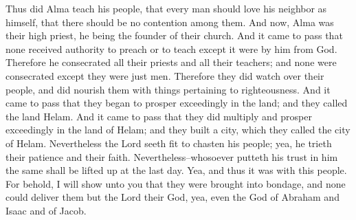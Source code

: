 Thus did Alma teach his people, that every man should love his neighbor as himself, that there should be no contention among them.
\bverse \iffalse And now, Alma was their high priest, he being the founder of their church. \fi
And now, Alma was their high priest, he being the founder of their church.
\bverse \iffalse And it came to pass that none received authority to preach or to teach except it were by him from God. Therefore he consecrated all their priests and all their teachers; and none were consecrated except they were just men. \fi
And it came to pass that none received authority to preach or to teach except it were by him from God. Therefore he consecrated all their priests and all their teachers; and none were consecrated except they were just men.
\bverse \iffalse Therefore they did watch over their people, and did nourish them with things pertaining to righteousness. \fi
Therefore they did watch over their people, and did nourish them with things pertaining to righteousness.
\bverse \iffalse And it came to pass that they began to prosper exceedingly in the land; and they called the land Helam. \fi
And it came to pass that they began to prosper exceedingly in the land; and they called the land Helam.
\bverse \iffalse And it came to pass that they did multiply and prosper exceedingly in the land of Helam; and they built a city, which they called the city of Helam. \fi
And it came to pass that they did multiply and prosper exceedingly in the land of Helam; and they built a city, which they called the city of Helam.
\bverse \iffalse Nevertheless the Lord seeth fit to chasten his people; yea, he trieth their patience and their faith. \fi
Nevertheless the Lord seeth fit to chasten his people; yea, he trieth their patience and their faith.
\bverse \iffalse Nevertheless--whosoever putteth his trust in him the same shall be lifted up at the last day. Yea, and thus it was with this people. \fi
Nevertheless--whosoever putteth his trust in him the same shall be lifted up at the last day. Yea, and thus it was with this people.
\bverse \iffalse For behold, I will show unto you that they were brought into bondage, and none could deliver them but the Lord their God, yea, even the God of Abraham and Isaac and of Jacob. \fi
For behold, I will show unto you that they were brought into bondage, and none could deliver them but the Lord their God, yea, even the God of Abraham and Isaac and of Jacob.
\bverse \iffalse And it came to pass that he did deliver them, and he did show forth his mighty power unto them, and great were their rejoicings. \fi
